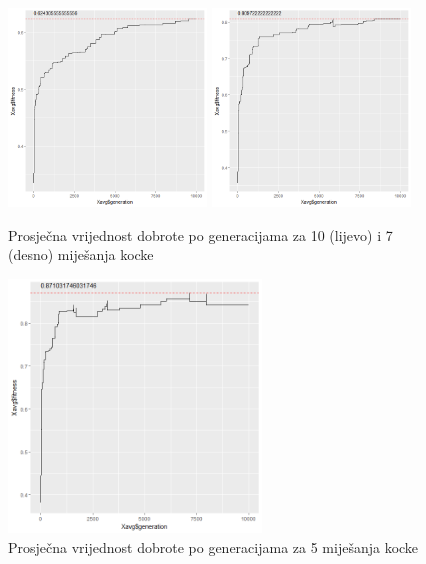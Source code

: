 \documentclass[times, utf8, seminar, numeric]{fer}
\begin{document}
  		\begin{figure}[h]
			\centering
			\includegraphics[width=0.47\textwidth]{../results/cubies_fitness/10_scrambles/cross0,5greedy10mut20.png}
			\includegraphics[width=0.47\textwidth]{../results/cubies_fitness/7_scrambles/cross0,5greedy10mut20.png}
			\caption{Prosječna vrijednost dobrote po generacijama za 10 (lijevo) i 7 (desno) miješanja kocke }
		\end{figure}
    
  		\begin{figure}[h]
			\centering
			\includegraphics[width=0.6\textwidth]{../results/cubies_fitness/5_scrambles/cross0,5greedy10mut20.png}
			\caption{Prosječna vrijednost dobrote po generacijama za 5 miješanja kocke }
		\end{figure}
\end{document}

